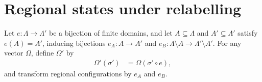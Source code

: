 \section{Regional states under relabelling}
\label{sec:area_law_regional_relabelling}

\begin{definition}
    \label{def:area_law_regional_relabelling}
    \leanok
    Let $e:\Lambda\to\Lambda'$ be a bijection of finite domains, and let
    $A\subseteq\Lambda$ and $A'\subseteq\Lambda'$ satisfy $e(A)=A'$,
    inducing bijections $e_A:A\to A'$ and
    $e_B:\Lambda\setminus A\to\Lambda'\setminus A'$.
    For any vector $\Omega$, define $\Omega'$ by
    \begin{align}
        \Omega'(\sigma') & =\Omega(\sigma'\circ e),
    \end{align}
    and transform regional configurations by $e_A$ and $e_B$.
\end{definition}

